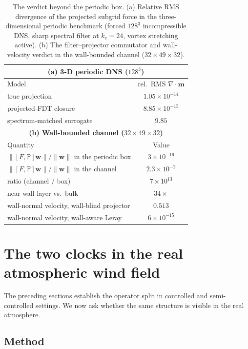 \documentclass[aps,prfluids,preprint,superscriptaddress,nofootinbib]{revtex4-2}
\begin{document}
\begin{table}[h]
\centering
\small
\caption{The verdict beyond the periodic box. (a) Relative RMS divergence of the projected subgrid force in the three-dimensional periodic benchmark (forced $128^3$ incompressible DNS, sharp spectral filter at $k_c=24$, vortex stretching active). (b) The filter--projector commutator and wall-velocity verdict in the wall-bounded channel ($32\times49\times32$).}
\label{tab:beyond}
\begin{tabular}{@{}lc@{}}
\toprule
\multicolumn{2}{c}{\textbf{(a) 3-D periodic DNS ($128^3$)}} \\
\midrule
Model & rel.\ RMS $\nabla\!\cdot\!\mathbf{m}$ \\
\midrule
true projection & $1.05\times10^{-14}$ \\
projected-FDT closure & $8.85\times10^{-15}$ \\
spectrum-matched surrogate & $9.85$ \\
\midrule
\multicolumn{2}{c}{\textbf{(b) Wall-bounded channel ($32\times49\times32$)}} \\
\midrule
Quantity & Value \\
\midrule
$\|[F,\mathbb{P}]\mathbf{w}\|/\|\mathbf{w}\|$ in the periodic box & $3\times10^{-16}$ \\
$\|[F,\mathbb{P}]\mathbf{w}\|/\|\mathbf{w}\|$ in the channel & $2.3\times10^{-2}$ \\
ratio (channel / box) & $7\times10^{13}$ \\
near-wall layer vs.\ bulk & $34\times$ \\
wall-normal velocity, wall-blind projector & $0.513$ \\
wall-normal velocity, wall-aware Leray & $6\times10^{-15}$ \\
\bottomrule
\end{tabular}
\end{table}

\section{The two clocks in the real atmospheric wind field}
\label{sec:reanalysis}

The preceding sections establish the operator split in controlled and semi-controlled settings. We now ask whether the same structure is visible in the real atmosphere.

\subsection{Method}
\end{document}
